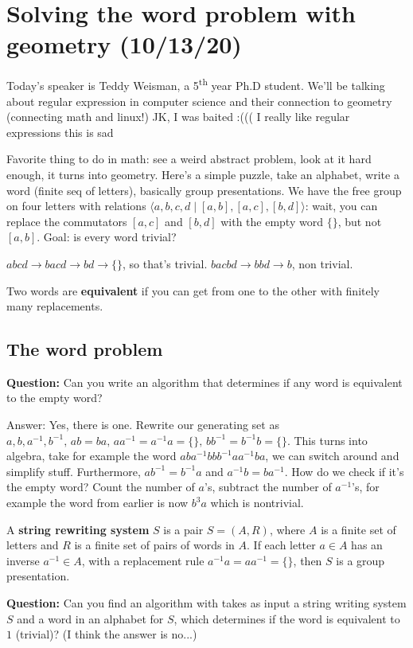\section{Solving the word problem with geometry (10/13/20)}
Today's speaker is Teddy Weisman, a 5\textsuperscript{th} year Ph.D student. We'll be talking about regular expression in computer science and their connection to geometry (connecting math and linux!) JK, I was baited :((( I really like regular expressions this is sad

Favorite thing to do in math: see a weird abstract problem, look at it hard enough, it turns into geometry.
\orbreak
Here's a simple puzzle, take an alphabet, write a word (finite seq of letters), basically group presentations. We have the free group on four letters with relations $\langle a,b,c,d \mid [a,b],[a,c],[b,d] \rangle $: wait, you can replace the commutators $[a,c]$ and $[b,d]$ with the empty word $\{\} $, but not $[a,b]$. Goal: is every word trivial? 
\begin{example}
    $abcd\to bacd\to bd\to \{\} $, so that's trivial. $bac bd\to bbd \to b$, non trivial.
\end{example}
\begin{definition}[]
    Two words are \textbf{equivalent} if you can get from one to the other with finitely many replacements.
\end{definition}
\subsection{The word problem}
\textbf{Question:} Can you write an algorithm that determines if any word is equivalent to the empty word? 

Answer: Yes, there is one. Rewrite our generating set as $a,b,a^{-1},b^{-1},\,ab=ba,\,aa^{-1}=a^{-1}a=\{\} ,\,bb^{-1}=b^{-1}b=\{\} $. This turns into algebra, take for example the word $aba^{-1}bbb^{-1}aa^{-1}ba$, we can switch around and simplify stuff. Furthermore, $ab^{-1}=b^{-1}a$ and $a^{-1}b=ba^{-1}$. How do we check if it's the empty word? Count the number of $a$'s, subtract the number of $a^{-1}$'s, for example the word from earlier is now $b^3a$ which is nontrivial.
\orbreak
\begin{definition}[]
    A \textbf{string rewriting system} $S$ is a pair $S=(A,R)$, where $A$ is a finite set of letters and $R$ is a finite set of pairs of words in $A$. If each letter $a\in A$ has an inverse $a^{-1}\in A$, with a replacement rule $a^{-1}a=aa^{-1}=\{\} $, then $S$ is a group presentation.
\end{definition}
\textbf{Question:} Can you find an algorithm with takes as input a string writing system $S$ and a word in an alphabet for $S$, which determines if the word is equivalent to $1$ (trivial)? (I think the answer is no...)

